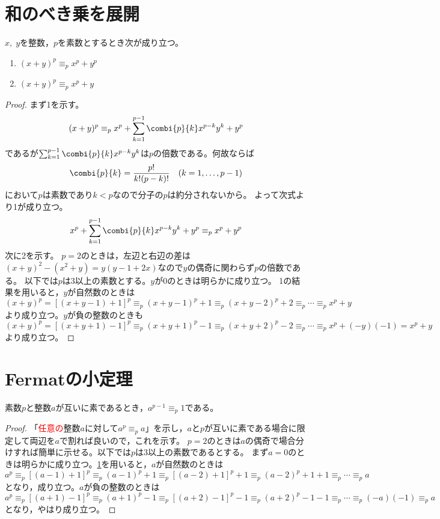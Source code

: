     \section{和のべき乗を展開}
        \label{整数の合同:和のべき乗を展開}
        $x,\;y$を整数，$p$を素数とするとき次が成り立つ。
        \begin{enumerate}
            \item $(x+y)^p \equiv_p x^p + y^p$
            \item $(x+y)^p \equiv_p x^p + y$
        \end{enumerate}
        \begin{proof}
            \quad\par
            まず1を示す。
            \[(x+y)^p \equiv_p x^p + \sum_{k=1}^{p-1} \combi{p}{k}x^{p-k}y^k + y^p\]
            であるが$\sum_{k=1}^{p-1} \combi{p}{k}x^{p-k}y^k$は$p$の倍数である。何故ならば
            \[ \combi{p}{k} =\frac{p!}{k!(p-k)!} \quad (k=1,\dotsc,p-1) \]
            において$p$は素数であり$k<p$なので分子の$p$は約分されないから。
            よって次式より1が成り立つ。
            \[ x^p + \sum_{k=1}^{p-1} \combi{p}{k}x^{p-k}y^k + y^p \equiv_p x^p + y^p \]
            次に2を示す。
            $p=2$のときは，左辺と右辺の差は$(x+y)^2 - (x^2+y) = y(y-1+2x)$なので$y$の偶奇に関わらず$p$の倍数である。
            以下では$p$は3以上の素数とする。$y$が0のときは明らかに成り立つ。
            1の結果を用いると，$y$が自然数のときは
            \[(x+y)^p = [(x+y-1) + 1]^p \equiv_p (x+y-1)^p + 1 \equiv_p (x+y-2)^p + 2 \equiv_p \dotsb \equiv_p x^p + y \]
            より成り立つ。$y$が負の整数のときも
            \[(x+y)^p = [(x+y+1) - 1]^p \equiv_p (x+y+1)^p - 1 \equiv_p (x+y+2)^p - 2 \equiv_p \dotsb \equiv_p x^p + (-y)(-1) = x^p + y \]
            より成り立つ。
        \end{proof}
    \section{Fermatの小定理}
        \begin{shadebox}
            素数$p$と整数$a$が互いに素であるとき，$a^{p-1} \equiv_p 1$である。
        \end{shadebox}
        \begin{proof}
            \quad\par
            「\textcolor{red}{任意の}整数$a$に対して$a^p \equiv_p a$」を示し，$a$と$p$が互いに素である場合に限定して両辺を$a$で割れば良いので，これを示す。
            $p=2$のときは$a$の偶奇で場合分けすれば簡単に示せる。以下では$p$は3以上の素数であるとする。
            まず$a=0$のときは明らかに成り立つ。\ref{整数の合同:和のべき乗を展開}を用いると，$a$が自然数のときは
            \[ a^p \equiv_p [(a-1)+1]^p \equiv_p (a-1)^p + 1 \equiv_p [(a-2) + 1]^p + 1 \equiv_p (a-2)^p + 1 + 1 \equiv_p \dotsb \equiv_p a\]
            となり，成り立つ。$a$が負の整数のときは
            \[ a^p \equiv_p [(a+1)-1]^p \equiv_p (a+1)^p - 1 \equiv_p [(a+2) - 1]^p - 1 \equiv_p (a+2)^p - 1 - 1 \equiv_p \dotsb \equiv_p (-a)(-1) \equiv_p a \]
            となり，やはり成り立つ。
        \end{proof}